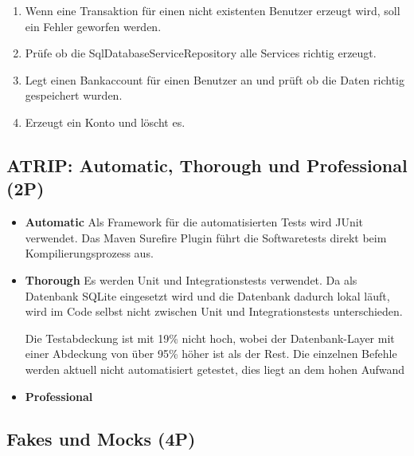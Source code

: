\begin{enumerate}
    \item {}
Wenn eine Transaktion für einen nicht existenten Benutzer erzeugt wird, soll ein Fehler geworfen werden. 
    

    \item {}
Prüfe ob die SqlDatabaseServiceRepository alle Services richtig erzeugt. 
    
    \item {}
Legt einen Bankaccount für einen Benutzer an und prüft ob die Daten richtig gespeichert wurden. 
    
    \item {}
Erzeugt ein Konto und löscht es. 
    
\end{enumerate}


\subsection{ATRIP: Automatic, Thorough und Professional (2P)}
\begin{itemize}
    \item \textbf{Automatic}\newline 
Als Framework für die automatisierten Tests wird JUnit verwendet. Das Maven Surefire Plugin führt die Softwaretests direkt beim Kompilierungsprozess aus. 
    \item \textbf{Thorough}\newline 
Es werden Unit und Integrationstests verwendet. Da als Datenbank SQLite eingesetzt wird und die Datenbank dadurch lokal läuft, wird im Code selbst nicht zwischen Unit und Integrationstests unterschieden.  

Die Testabdeckung ist mit 19\% nicht hoch, wobei der Datenbank-Layer mit einer Abdeckung von über 95\% höher ist als der Rest. Die einzelnen Befehle werden aktuell nicht automatisiert getestet, dies liegt an dem hohen Aufwand  

 
    \item \textbf{Professional}\newline 

\end{itemize}


\subsection{Fakes und Mocks (4P)}
